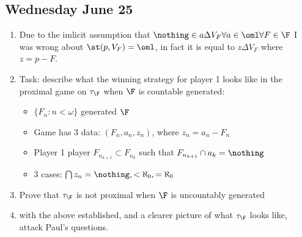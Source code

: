 \documentclass{article}
\begin{document}
\subsection*{Wednesday June 25}
\begin{enumerate}
    \item Due to the imlicit assumption that \(\nothing \in a\Delta V_F \forall a\in\oml\forall F \in \F\) I was wrong about \(\st(p, V_F) = \oml\), in fact it is equal to \(z\Delta V_F\) where \(z = p - F\). 
    \item Task:  \checkmark describe what the winning strategy for player 1 looks like in the proximal game on \(\tau_{\F}\) when \(\F\) is  countable generated:
    \begin{itemize}
        \item \(\{F_n: n < \omega\}\) generated \(\F\) 
        \item Game has 3 data: \((F_n, a_n, z_n)\), where \(z_n = a_n - F_n\)
        \item Player 1 player \(F_{n_{k+1}} \subset F_{n_k}\) such that \(F_{n_{k+1}}\cap a_k = \nothing\)
        \item 3 cases: \(\bigcap z_n = \nothing, < \aleph_0, = \aleph_0\)
    \end{itemize}
    \item Prove that \(\tau_{\F}\) is not proximal when \(\F\) is uncountably generated \checkmark
    \item with the above established, and a clearer picture of what \(\tau_{\F}\) looks like, attack Paul's questions.
    
\end{enumerate}
\end{document}
